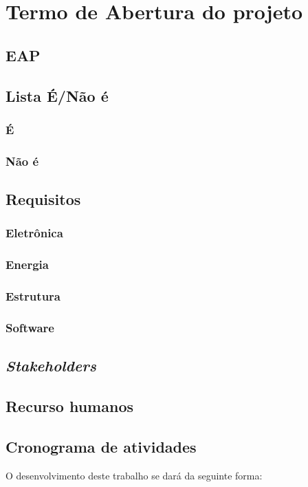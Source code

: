 \chapter{Termo de Abertura do projeto}

\section{EAP}
\section{Lista É/Não é}
\subsection{É}
\subsection{Não é}
\section{Requisitos}
\subsection{Eletrônica}
\subsection{Energia}
\subsection{Estrutura}
\subsection{Software}
\section{\emph{Stakeholders}}
\section{Recurso humanos}
\section{Cronograma de atividades}

O desenvolvimento deste trabalho se dará da seguinte forma:

